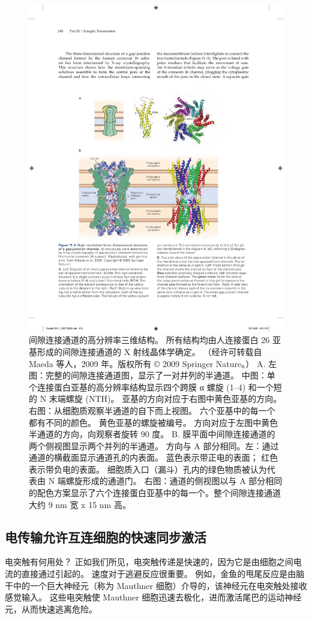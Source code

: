 \begin{figure}[htbp]
	\centering
	\includegraphics[width=0.7\linewidth]{chap11/fig_11_5}
	\caption{间隙连接通道的高分辨率三维结构。 所有结构均由人连接蛋白 26 亚基形成的间隙连接通道的 X 射线晶体学确定。 （经许可转载自 Maeda 等人，2009 年。版权所有 © 2009 Springer Nature。） A. 左图：完整的间隙连接通道图，显示了一对并列的半通道。 中图：单个连接蛋白亚基的高分辨率结构显示四个跨膜 α 螺旋 (1–4) 和一个短的 N 末端螺旋 (NTH)。 亚基的方向对应于右图中黄色亚基的方向。 右图：从细胞质观察半通道的自下而上视图。 六个亚基中的每一个都有不同的颜色。 黄色亚基的螺旋被编号。 方向对应于左图中黄色半通道的方向，向观察者旋转 90 度。 B. 膜平面中间隙连接通道的两个侧视图显示两个并列的半通道。 方向与 A 部分相同。左：通过通道的横截面显示通道孔的内表面。 蓝色表示带正电的表面； 红色表示带负电的表面。 细胞质入口（漏斗）孔内的绿色物质被认为代表由 N 端螺旋形成的通道门。 右图：通道的侧视图以与 A 部分相同的配色方案显示了六个连接蛋白亚基中的每一个。整个间隙连接通道大约 9 nm 宽 x 15 nm 高。}
	\label{fig:11_5}
\end{figure}


\subsection{电传输允许互连细胞的快速同步激活}

电突触有何用处？
正如我们所见，电突触传递是快速的，因为它是由细胞之间电流的直接通过引起的。
速度对于逃避反应很重要。
例如，金鱼的甩尾反应是由脑干中的一个巨大神经元（称为 Mauthner 细胞）介导的，该神经元在电突触处接收感觉输入。
这些电突触使 Mauthner 细胞迅速去极化，进而激活尾巴的运动神经元，从而快速逃离危险。


